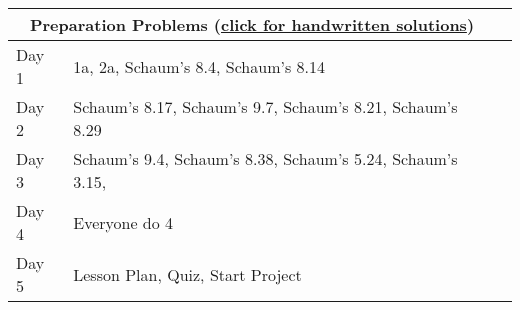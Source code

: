 \begin{center}
\begin{tabular}{ll|l}
\multicolumn{2}{c}{Preparation Problems (\href{http://ilearn.byui.edu/bbcswebdav/institution/Physical\_Sci\_Eng/Mathematics/Personal\%20Folders/WoodruffB/341/4-Linear-Transformations-Preparation-Solutions.pdf}{click for handwritten solutions})}
\\
\hline\hline
Day 1& 
1a, 
2a, 
Schaum's 8.4, 
Schaum's 8.14
\\ \hline
Day 2& 
Schaum's 8.17, 
Schaum's 9.7, 
Schaum's 8.21, 
Schaum's 8.29
\\ \hline
Day 3& 
Schaum's 9.4, 
Schaum's 8.38, 
Schaum's 5.24,
Schaum's 3.15, 
\\ \hline
Day 4&
Everyone do 4
&
\\ \hline
Day 5&
Lesson Plan,
Quiz, Start Project 
&
\\ \hline
\end{tabular}
\end{center}


